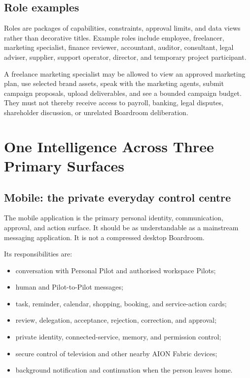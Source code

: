 \documentclass[11pt,a4paper]{article}
\begin{document}
\subsection{Role examples}

Roles are packages of capabilities, constraints, approval limits, and data
views rather than decorative titles.  Example roles include employee,
freelancer, marketing specialist, finance reviewer, accountant, auditor,
consultant, legal adviser, supplier, support operator, director, and temporary
project participant.

A freelance marketing specialist may be allowed to view an approved marketing
plan, use selected brand assets, speak with the marketing agents, submit
campaign proposals, upload deliverables, and see a bounded campaign budget.
They must not thereby receive access to payroll, banking, legal disputes,
shareholder discussion, or unrelated Boardroom deliberation.

\section{One Intelligence Across Three Primary Surfaces}

\subsection{Mobile: the private everyday control centre}

The mobile application is the primary personal identity, communication,
approval, and action surface.  It should be as understandable as a mainstream
messaging application.  It is not a compressed desktop Boardroom.

Its responsibilities are:

\begin{itemize}[leftmargin=*]
  \item conversation with Personal Pilot and authorised workspace Pilots;
  \item human and Pilot-to-Pilot messages;
  \item task, reminder, calendar, shopping, booking, and service-action cards;
  \item review, delegation, acceptance, rejection, correction, and approval;
  \item private identity, connected-service, memory, and permission control;
  \item secure control of television and other nearby AION Fabric devices;
  \item background notification and continuation when the person leaves home.
\end{itemize}
\end{document}
